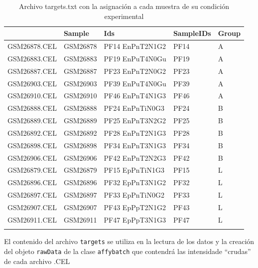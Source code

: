 \documentclass[a4paper]{article}\usepackage[]{graphicx}\usepackage[]{color}
\makeatletter
\newenvironment{kframe}{%
 \def\at@end@of@kframe{}%
 \ifinner\ifhmode%
  \def\at@end@of@kframe{\end{minipage}}%
  \begin{minipage}{\columnwidth}%
 \fi\fi%
 \def\FrameCommand##1{\hskip\@totalleftmargin \hskip-\fboxsep
 \colorbox{shadecolor}{##1}\hskip-\fboxsep
     \hskip-\linewidth \hskip-\@totalleftmargin \hskip\columnwidth}%
 \MakeFramed {\advance\hsize-\width
   \@totalleftmargin\z@ \linewidth\hsize
   \@setminipage}}%
 {\par\unskip\endMakeFramed%
 \at@end@of@kframe}
\makeatother
\begin{document}
\begin{kframe}


{\ttfamily\noindent\itshape\color{messagecolor}{\#\# Loading required package: xtable}}\end{kframe}%
\begin{longtable}{rllll}
  \hline
 & Sample & Ids & SampleIDs & Group \\ 
  \hline
GSM26878.CEL & GSM26878 & PF14 EnPnT2N1G2 & PF14 & A \\ 
  GSM26883.CEL & GSM26883 & PF19 EnPuT4N0Gu & PF19 & A \\ 
  GSM26887.CEL & GSM26887 & PF23 EnPnT2N0G2 & PF23 & A \\ 
  GSM26903.CEL & GSM26903 & PF39 EnPuT4N0Gu & PF39 & A \\ 
  GSM26910.CEL & GSM26910 & PF46 EnPnT4N1G3 & PF46 & A \\ 
  GSM26888.CEL & GSM26888 & PF24 EnPnTiN0G3 & PF24 & B \\ 
  GSM26889.CEL & GSM26889 & PF25 EnPnT3N2G2 & PF25 & B \\ 
  GSM26892.CEL & GSM26892 & PF28 EnPnT2N1G3 & PF28 & B \\ 
  GSM26898.CEL & GSM26898 & PF34 EnPnT3N1G3 & PF34 & B \\ 
  GSM26906.CEL & GSM26906 & PF42 EnPnT2N2G3 & PF42 & B \\ 
  GSM26879.CEL & GSM26879 & PF15 EpPnTiN1G3 & PF15 & L \\ 
  GSM26896.CEL & GSM26896 & PF32 EpPnT3N1G2 & PF32 & L \\ 
  GSM26897.CEL & GSM26897 & PF33 EpPnTiN0G2 & PF33 & L \\ 
  GSM26907.CEL & GSM26907 & PF43 EpPpT2N1G2 & PF43 & L \\ 
  GSM26911.CEL & GSM26911 & PF47 EpPpT3N1G3 & PF47 & L \\ 
   \hline
\hline
\caption{Archivo targets.txt con la asignación a cada muestra de su condición experimental} 
\end{longtable}


El contenido del archivo \texttt{targets} se utiliza en la lectura de los datos y la creación del objeto \texttt{rawData} de la clase \texttt{affybatch} que contendrá las intensidade ``crudas'' de cada archivo .CEL
\end{document}
